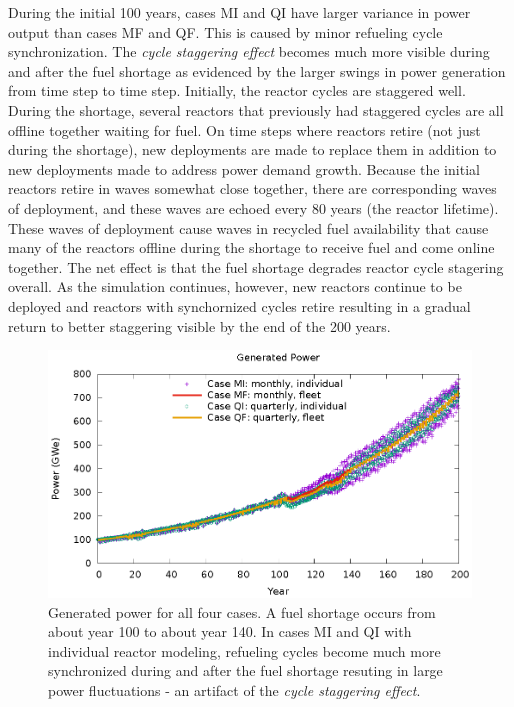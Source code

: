 \documentclass{style}
\begin{document}
During the initial 100 years, cases MI and QI have larger variance in power
output than cases MF and QF.  This is caused by minor refueling cycle
synchronization.  The \emph{cycle staggering effect} becomes much more visible
during and after the fuel shortage as evidenced by the larger swings in power
generation from time step to time step.  Initially, the reactor cycles are
staggered well.  During the shortage, several reactors that previously had
staggered cycles are all offline together waiting for fuel.  On time steps
where reactors retire (not just during the shortage), new deployments are made
to replace them in addition to new deployments made to address power demand
growth.  Because the initial reactors retire in waves somewhat close together,
there are corresponding waves of deployment, and these waves are echoed every
80 years (the reactor lifetime).  These waves of deployment cause waves in
recycled fuel availability that cause many of the reactors offline during the
shortage to receive fuel and come online together.  The net effect is that the
fuel shortage degrades reactor cycle stagering overall.  As the simulation
continues, however, new reactors continue to be deployed and reactors with
synchornized cycles retire resulting in a gradual return to better
staggering visible by the end of the 200 years.

\begin{figure}[!h]
    \centering
    \includegraphics[width=1.0\textwidth]{exp2/power.eps}
    \caption[Generated power]{
        Generated power for all four cases.  A fuel shortage occurs from about
        year 100 to about year 140.  In cases MI and QI with individual reactor
        modeling, refueling cycles become much more synchronized during and
        after the fuel shortage resuting in large power fluctuations - an artifact of the
        \emph{cycle staggering effect}.
    }
    \label{fig:power}
\end{figure}
\end{document}
